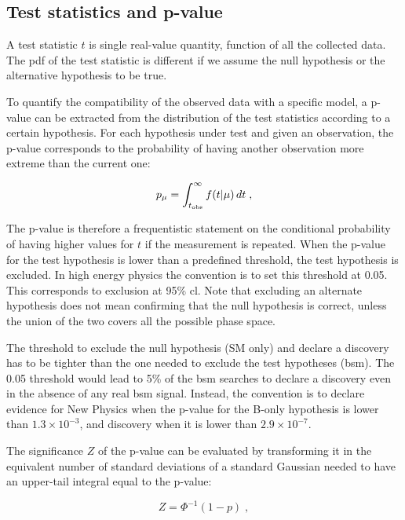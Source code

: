 \subsection{Test statistics and p-value}

 A test statistic $t$ is single real-value quantity, function of all the collected data. The \gls{pdf} of the test statistic is different if we assume the null hypothesis or the alternative hypothesis to be true.

To quantify the compatibility of the observed data with a specific model, a p-value can be extracted from the distribution of the test statistics according to a certain hypothesis. For each hypothesis under test and given an observation, the p-value corresponds to the probability of having another observation more extreme than the current one:

\begin{equation}
\label{eq:stat:pval}
p_{\mu} = \int_{t_{{\rm obs}}}^{\infty} f(t | \mu ) \,
d t \; ,
\end{equation}

The p-value is therefore a frequentistic statement on the conditional probability of having higher values for $t$ if the measurement is repeated. When the p-value for the test hypothesis is lower than a predefined threshold, the test hypothesis is excluded. In high energy physics the convention is to set this threshold at 0.05. This corresponds to exclusion at 95\% \gls{cl}. Note that excluding an alternate hypothesis does not mean confirming that the null hypothesis is correct, unless the union of the two covers all the possible phase space.

The threshold to exclude the null hypothesis (SM only) and declare a discovery has to be tighter than the one needed to exclude the test hypotheses (\gls{bsm}). The 0.05 threshold would lead to 5\% of the \gls{bsm} searches to declare a discovery even in the absence of any real \gls{bsm} signal. Instead, the convention is to declare evidence for New Physics when the p-value for the B-only hypothesis is lower than $1.3 \times 10^{-3}$, and discovery when it is lower than $2.9 \times 10^{-7}$.

The significance $Z$ of the p-value can be evaluated by transforming it in the equivalent number of standard deviations of a standard Gaussian needed to have an upper-tail integral equal to the p-value:

\begin{equation}
\label{eq:stat:sig}
Z = \Phi^{-1}(1-p) \; ,
\end{equation} 


